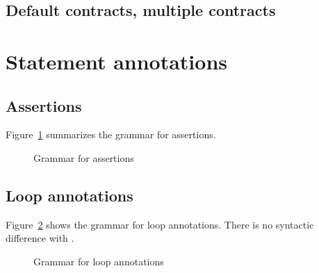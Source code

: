 
\subsection{Default contracts, multiple contracts}
\nodiff


\section{Statement annotations}


\subsection{Assertions}
\label{sec:assertions}
\nodiff

Figure~\ref{fig:gram:assertions} summarizes the grammar for assertions.
\begin{figure}[htbp]
  \begin{cadre}
    
  \end{cadre}
  \caption{Grammar for assertions}
  \label{fig:gram:assertions}
\end{figure}


\subsection{Loop annotations}
\label{sec:loop_annot}


Figure~\ref{fig:gram:loops} shows the grammar for loop annotations. There is no
syntactic difference with \acsl.
\begin{figure}[htbp]
  \begin{cadre}
    
  \end{cadre}
  \caption{Grammar for loop annotations}
  \label{fig:gram:loops}
\end{figure}

